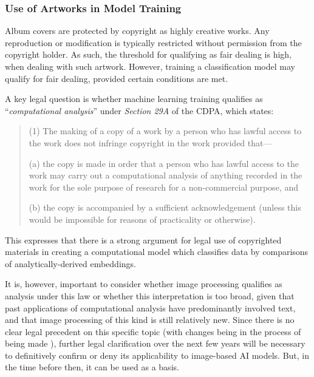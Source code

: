               \subsubsection{Use of Artworks in Model Training}
              
                  Album covers are protected by copyright as highly creative works. Any reproduction or modification is typically restricted without permission from the copyright holder. As such, the threshold for qualifying as fair dealing is high, when dealing with such artwork. However, training a classification model may qualify for fair dealing, provided certain conditions are met.
    
                  A key legal question is whether machine learning training qualifies as ``\textit{computational analysis}'' under \textit{Section 29A} of the CDPA, which states:
                  \begin{quote}
                      (1) The making of a copy of a work by a person who has lawful access to the work does not infringe copyright in the work provided that—
                  
                          (a) the copy is made in order that a person who has lawful access to the work may carry out a computational analysis of anything recorded in the work for the sole purpose of research for a non-commercial purpose, and
                          
                          (b) the copy is accompanied by a sufficient acknowledgement (unless this would be impossible for reasons of practicality or otherwise). \cite{cdpa1988}
                  \end{quote}
    
                  This expresses that there is a strong argument for legal use of copyrighted materials in creating a computational model which classifies data by comparisons of analytically-derived embeddings.
    
                  It is, however, important to consider whether image processing qualifies as analysis under this law or whether this interpretation is too broad, given that past applications of computational analysis have predominantly involved text, and that image processing of this kind is still relatively new. Since there is no clear legal precedent on this specific topic (with changes being in the process of being made \cite{guardian2024uk_ai_copyright}), further legal clarification over the next few years will be necessary to definitively confirm or deny its applicability to image-based AI models. But, in the time before then, it can be used as a basis.
    
